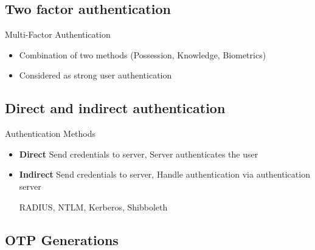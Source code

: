 \subsection{Two factor authentication}

\begin{concept}{Multi-Factor Authentication}\\
    \begin{itemize}
        \item Combination of two methods (Possession, Knowledge, Biometrics)
        \item Considered as strong user authentication
    \end{itemize}
\end{concept}

\subsection{Direct and indirect authentication}

\begin{definition}{Authentication Methods}\\
    \begin{itemize}
        \item \textbf{Direct} Send credentials to server, Server authenticates the user
        \item \textbf{Indirect} Send credentials to server, Handle authentication via authentication server
        
        RADIUS, NTLM, Kerberos, Shibboleth
    \end{itemize}
\end{definition}

\subsection{OTP Generations}

